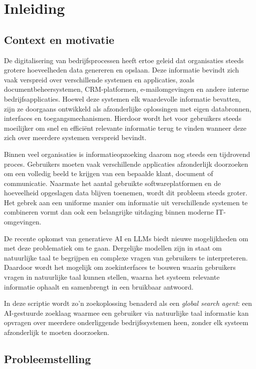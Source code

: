 \chapter{Inleiding}
\label{chap:intro}

\section{Context en motivatie}
\label{sec:context}

De digitalisering van bedrijfsprocessen heeft ertoe geleid dat organisaties steeds grotere hoeveelheden data genereren en opslaan. Deze informatie bevindt zich vaak verspreid over verschillende systemen en applicaties, zoals documentbeheersystemen, \gls{CRM}-platformen, e-mailomgevingen en andere interne bedrijfsapplicaties. Hoewel deze systemen elk waardevolle informatie bevatten, zijn ze doorgaans ontwikkeld als afzonderlijke oplossingen met eigen databronnen, interfaces en toegangsmechanismen. Hierdoor wordt het voor gebruikers steeds moeilijker om snel en efficiënt relevante informatie terug te vinden wanneer deze zich over meerdere systemen verspreid bevindt.

Binnen veel organisaties is informatieopzoeking daarom nog steeds een tijdrovend proces. Gebruikers moeten vaak verschillende applicaties afzonderlijk doorzoeken om een volledig beeld te krijgen van een bepaalde klant, document of communicatie. Naarmate het aantal gebruikte softwareplatformen en de hoeveelheid opgeslagen data blijven toenemen, wordt dit probleem steeds groter. Het gebrek aan een uniforme manier om informatie uit verschillende systemen te combineren vormt dan ook een belangrijke uitdaging binnen moderne \gls{IT}-omgevingen.

De recente opkomst van generatieve \gls{AI} en \glspl{LLM} biedt nieuwe mogelijkheden om met deze problematiek om te gaan. Dergelijke modellen zijn in staat om natuurlijke taal te begrijpen en complexe vragen van gebruikers te interpreteren. Daardoor wordt het mogelijk om zoekinterfaces te bouwen waarin gebruikers vragen in natuurlijke taal kunnen stellen, waarna het systeem relevante informatie ophaalt en samenbrengt in een bruikbaar antwoord.

In deze scriptie wordt zo'n zoekoplossing benaderd als een \textit{global search agent}: een AI-gestuurde zoeklaag waarmee een gebruiker via natuurlijke taal informatie kan opvragen over meerdere onderliggende bedrijfssystemen heen, zonder elk systeem afzonderlijk te moeten doorzoeken.
\section{Probleemstelling}
\label{sec:probleem}

